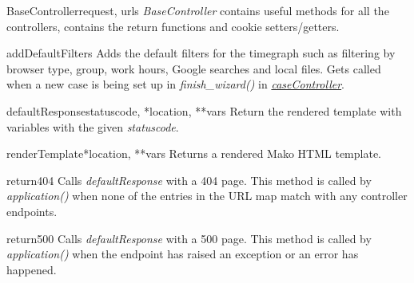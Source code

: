 \documentclass[letterpaper,10pt,english]{manual}
\begin{document}
\hypertarget{webscavator.controllers.baseController.BaseController}{}\begin{classdesc}{BaseController}{request, urls}
\emph{BaseController} contains useful methods for all the controllers, 
contains the return functions and cookie setters/getters.

\hypertarget{webscavator.controllers.baseController.BaseController.addDefaultFilters}{}\begin{methoddesc}{addDefaultFilters}{}
Adds the default filters for the timegraph such as filtering by browser type,
group, work hours, Google searches and local files. Gets called when a new case
is being set up in \emph{finish\_wizard()} in \hyperlink{--doc-caseController}{\emph{caseController}}.
\end{methoddesc}

\hypertarget{webscavator.controllers.baseController.BaseController.defaultResponse}{}\begin{methoddesc}{defaultResponse}{statuscode, *location, **vars}
Return the rendered template with variables with the given \emph{statuscode}.
\end{methoddesc}

\hypertarget{webscavator.controllers.baseController.BaseController.renderTemplate}{}\begin{methoddesc}{renderTemplate}{*location, **vars}
Returns a rendered Mako HTML template.
\end{methoddesc}

\hypertarget{webscavator.controllers.baseController.BaseController.return404}{}\begin{methoddesc}{return404}{}
Calls \emph{defaultResponse} with a 404 page. This method is called by 
\emph{application()} when none of
the entries in the URL map match with any controller endpoints.
\end{methoddesc}

\hypertarget{webscavator.controllers.baseController.BaseController.return500}{}\begin{methoddesc}{return500}{}
Calls \emph{defaultResponse} with a 500 page. This method is called by 
\emph{application()} when the endpoint
has raised an exception or an error has happened.
\end{methoddesc}


\end{classdesc}
\end{document}
